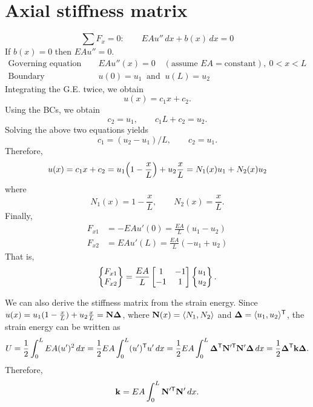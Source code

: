 \section{Axial stiffness matrix}
\begin{fig}
  
\end{fig}
\begin{equation*}
  \textstyle\sum F_x = 0:\qquad EAu''\,dx + b(x)\,dx = 0
\end{equation*}
If $b(x) = 0$ then $EAu'' = 0$.
\begin{align*}
  \text{Governing equation (G.E.):}&\quad EAu''(x) = 0\quad(\text{assume } EA = \text{constant}),\ 0 < x < L\\
  \text{Boundary conditions (BCs):}&\quad u(0) = u_1\ \text{ and }\ u(L) = u_2
\end{align*}
Integrating the G.E. twice, we obtain
\begin{equation*}
  u(x) = c_1x + c_2.
\end{equation*}
Using the BCs, we obtain
\begin{equation*}
  c_2 = u_1,\qquad c_1L + c_2 = u_2.
\end{equation*}
Solving the above two equations yields
\begin{equation*}
  c_1 = (u_2-u_1)/L,\qquad c_2 = u_1.
\end{equation*}
Therefore,
\begin{equation}
  u(x) = c_1x + c_2 = u_1\Bigl(1-\frac{x}{L}\Bigr) + u_2\frac{x}{L} = N_1(x)u_1 + N_2(x)u_2
\end{equation}
where
\begin{equation}
  N_1(x) = 1-\frac{x}{L},\qquad N_2(x) = \frac{x}{L}.
\end{equation}
Finally,
\begin{align}
  F_{x1} &= -EAu'(0) = \frac{EA}{L}(u_1-u_2)\\
  F_{x2} &= EAu'(L) = \frac{EA}{L}(-u_1+u_2)
\end{align}
That is,
\begin{equation}
  \begin{Bmatrix}F_{x1}\\ F_{x2}\end{Bmatrix} = \frac{EA}{L}\begin{bmatrix}1 & -1\\ -1 & 1\end{bmatrix}\begin{Bmatrix}u_1\\ u_2\end{Bmatrix}.
\end{equation}

We can also derive the stiffness matrix from the strain energy. Since $u(x) = u_1(1-\frac{x}{L}) + u_2\frac{x}{L} = \mathbf{N}\bm{\Delta}$, where $\mathbf{N}(x) = \langle N_1, N_2\rangle$ and $\bm{\Delta} = \langle u_1, u_2\rangle^{\mathsf{T}}$, the strain energy can be written as
\begin{equation}
  U = \frac12\int_0^L EA(u')^2\,dx = \frac12 EA\int_0^L (u')^{\mathsf{T}} u'\,dx
    = \frac12 EA\int_0^L \bm{\Delta}^{\mathsf{T}}\mathbf{N}'^{\mathsf{T}}\mathbf{N}'\bm{\Delta}\,dx = \frac12\bm{\Delta}^{\mathsf{T}}\mathbf{k}\bm{\Delta}.
\end{equation}
Therefore,
\begin{equation}
  \mathbf{k} = EA\int_0^L \mathbf{N}'^{\mathsf{T}}\mathbf{N}'\,dx.
\end{equation}

